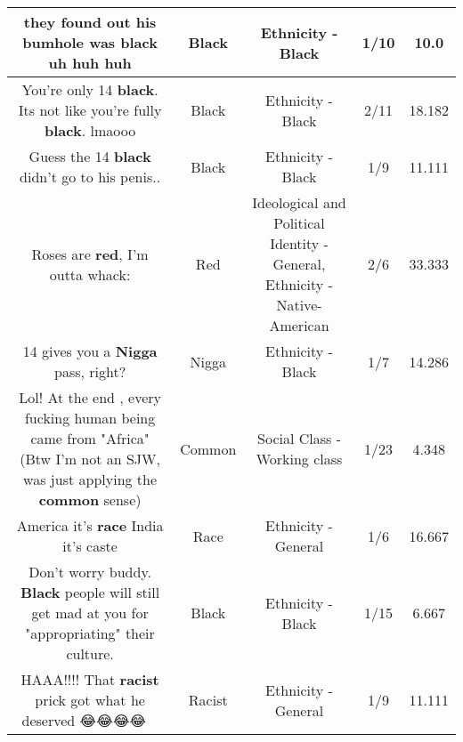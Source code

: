 \documentclass[11pt]{article}
\newlength\mylength
\begin{document}
\begin{center}
\begin{longtable}{|C{.65\mylength}|C{.30\mylength}|C{.12\mylength}|C{.12\mylength}|C{.12\mylength}|}
  \small they found out his bumhole was \textbf{black} uh huh huh\normalsize   & Black & Ethnicity - Black & 1/10 & 10.0 \\  \hline
  \small You're only 14 \textbf{black}. Its not like you're fully \textbf{black}. lmaooo\normalsize   & Black & Ethnicity - Black & 2/11 & 18.182 \\  \hline
  \small Guess the 14 \textbf{black} didn't go to his penis..\normalsize   & Black & Ethnicity - Black & 1/9 & 11.111 \\  \hline
  \small Roses are \textbf{r\textbf{ed}}, I'm outta whack:\normalsize   & Red &  Ideological and Political Identity - General, Ethnicity - Native-American & 2/6 & 33.333 \\  \hline
  \small 14 gives you a \textbf{Nigga} pass, right?\normalsize   & Nigga & Ethnicity - Black & 1/7 & 14.286 \\  \hline
  \small Lol! At the end , every fucking human being came from "Africa" (Btw I'm not an SJW, was just applying the \textbf{common} sense)\normalsize   & Common & Social Class - Working class & 1/23 & 4.348 \\  \hline
  \small America it's \textbf{race} India it's caste\normalsize   & Race & Ethnicity - General & 1/6 & 16.667 \\  \hline
  \small Don't worry buddy. \textbf{Black} people will still get mad at you for "appropriating" their culture.\normalsize   & Black & Ethnicity - Black & 1/15 & 6.667 \\  \hline
  \small HAAA!!!! That \textbf{racist} prick got what he deserved 😂😂😂😂🤣🤣🤣\normalsize   & Racist & Ethnicity - General & 1/9 & 11.111 \\  \hline

\end{longtable}
\end{center}
\end{document}
